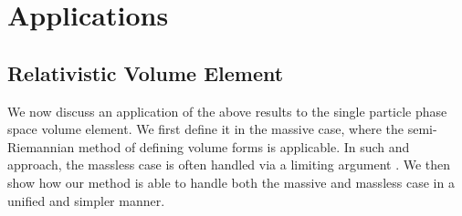 \section{Applications}
\subsection{Relativistic Volume Element}\label{rel_vol_form}
We now discuss an application of the above results to the single particle phase space volume element. We first define it in the massive case, where the semi-Riemannian method of defining volume forms is applicable.  In such and approach, the massless case is often handled via a limiting argument \cite{tsamparlis}.  We then show how our method is able to handle both the massive and massless case in a unified and simpler manner.

